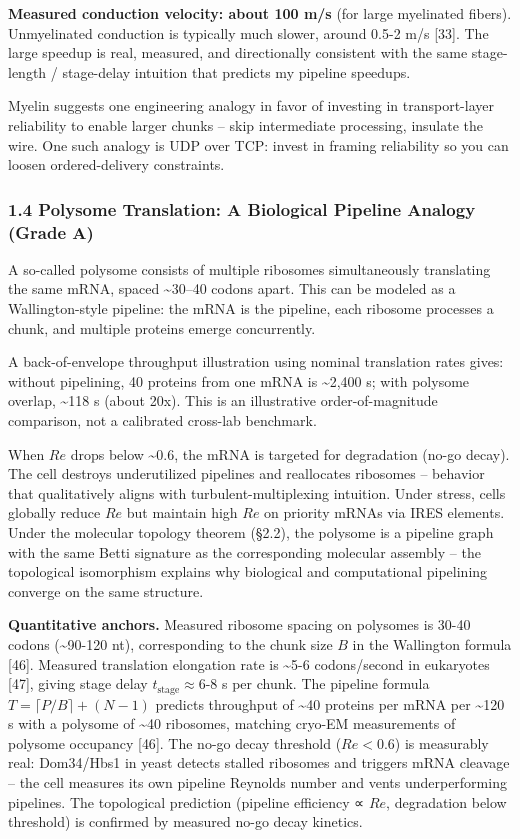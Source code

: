 \documentclass[
  11pt,
]{article}
\begin{document}
\textbf{Measured conduction velocity: about 100 m/s} (for large
myelinated fibers). Unmyelinated conduction is typically much slower,
around 0.5-2 m/s {[}33{]}. The large speedup is real, measured, and
directionally consistent with the same stage-length / stage-delay
intuition that predicts my pipeline speedups.

Myelin suggests one engineering analogy in favor of investing in
transport-layer reliability to enable larger chunks -- skip intermediate
processing, insulate the wire. One such analogy is UDP over TCP: invest
in framing reliability so you can loosen ordered-delivery constraints.

\subsubsection{1.4 Polysome Translation: A Biological Pipeline Analogy
(Grade
A)}\label{polysome-translation-a-biological-pipeline-analogy-grade-a}

A so-called polysome consists of multiple ribosomes simultaneously
translating the same mRNA, spaced \textasciitilde30--40 codons apart.
This can be modeled as a Wallington-style pipeline: the mRNA is the
pipeline, each ribosome processes a chunk, and multiple proteins emerge
concurrently.

A back-of-envelope throughput illustration using nominal translation
rates gives: without pipelining, 40 proteins from one mRNA is
\textasciitilde2,400 s; with polysome overlap, \textasciitilde118 s
(about 20x). This is an illustrative order-of-magnitude comparison, not
a calibrated cross-lab benchmark.

When \(Re\) drops below \textasciitilde0.6, the mRNA is targeted for
degradation (no-go decay). The cell destroys underutilized pipelines and
reallocates ribosomes -- behavior that qualitatively aligns with
turbulent-multiplexing intuition. Under stress, cells globally reduce
\(Re\) but maintain high \(Re\) on priority mRNAs via IRES elements.
Under the molecular topology theorem (§2.2), the polysome is a pipeline
graph with the same Betti signature as the corresponding molecular
assembly -- the topological isomorphism explains why biological and
computational pipelining converge on the same structure.

\textbf{Quantitative anchors.} Measured ribosome spacing on polysomes is
30-40 codons (\textasciitilde90-120 nt), corresponding to the chunk size
\(B\) in the Wallington formula {[}46{]}. Measured translation
elongation rate is \textasciitilde5-6 codons/second in eukaryotes
{[}47{]}, giving stage delay \(t_{\text{stage}} \approx 6\)-\(8\) s per
chunk. The pipeline formula \(T = \lceil P/B \rceil + (N-1)\) predicts
throughput of \textasciitilde40 proteins per mRNA per \textasciitilde120
s with a polysome of \textasciitilde40 ribosomes, matching cryo-EM
measurements of polysome occupancy {[}46{]}. The no-go decay threshold
(\(Re < 0.6\)) is measurably real: Dom34/Hbs1 in yeast detects stalled
ribosomes and triggers mRNA cleavage -- the cell measures its own
pipeline Reynolds number and vents underperforming pipelines. The
topological prediction (pipeline efficiency ∝ \(Re\), degradation below
threshold) is confirmed by measured no-go decay kinetics.
\end{document}

